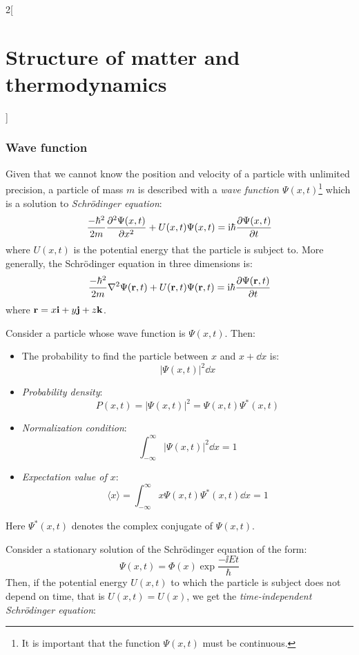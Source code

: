 \documentclass[../../../main.tex]{subfiles}
\begin{document}
\begin{multicols}{2}[\section{Structure of matter and thermodynamics}]
    \subsubsection*{Wave function}
    \begin{definition}
        Given that we cannot know the position and velocity of a particle with unlimited precision, a particle of mass $m$ is described with a \textit{wave function $\Psi(x,t)$}\footnote{It is important that the function $\Psi(x,t)$ must be continuous.} which is a solution to \textit{Schrödinger equation}:
        $$\frac{-\hbar^2}{2m}\pdv[2]{\Psi(x,t)}{x}+U(x,t)\Psi(x,t)=\mathrm{i}\hbar\pdv{\Psi(x,t)}{t}$$
        where $U(x,t)$ is the potential energy that the particle is subject to. More generally, the Schrödinger equation in three dimensions is:
        $$\frac{-\hbar^2}{2m}\laplacian\Psi(\vectorfunction{r},t)+U(\vectorfunction{r},t)\Psi(\vectorfunction{r},t)=\ii\hbar\pdv{\Psi(\vectorfunction{r},t)}{t}$$ where $\boldsymbol{\mathrm{r}}=x\boldsymbol{\mathrm{i}}+y\boldsymbol{\mathrm{j}}+z\boldsymbol{\mathrm{k}}$.
    \end{definition}
    \begin{prop}
        Consider a particle whose wave function is $\Psi(x,t)$. Then:
        \begin{itemize}
            \item The probability to find the particle between $x$ and $x+\dd x$ is: $$|\Psi(x,t)|^2\dd x$$
            \item \textit{Probability density}: $$P(x,t)=|\Psi(x,t)|^2=\Psi(x,t)\Psi^*(x,t)$$
            \item \textit{Normalization condition}: $$\int_{-\infty}^\infty|\Psi(x,t)|^2\dd x=1$$
            \item \textit{Expectation value of $x$}: $$\langle x\rangle=\int_{-\infty}^\infty x\Psi(x,t)\Psi^*(x,t)\dd x=1$$
        \end{itemize}
        Here $\Psi^*(x,t)$ denotes the complex conjugate of $\Psi(x,t)$.
    \end{prop}
    \begin{definition}
        Consider a stationary solution of the Schrö\-din\-ger equation of the form: $$\Psi(x,t)=\Phi(x)\exp{\frac{-\ii Et}{\hbar}}$$
        Then, if the potential energy $U(x,t)$ to which the particle is subject does not depend on time, that is $U(x,t)=U(x)$, we get the \textit{time-independent Schrödinger equation}:
        \begin{equation}\label{SMT-TI_schrodinger}

\end{equation}
\end{definition}
\end{multicols}
\end{document}
